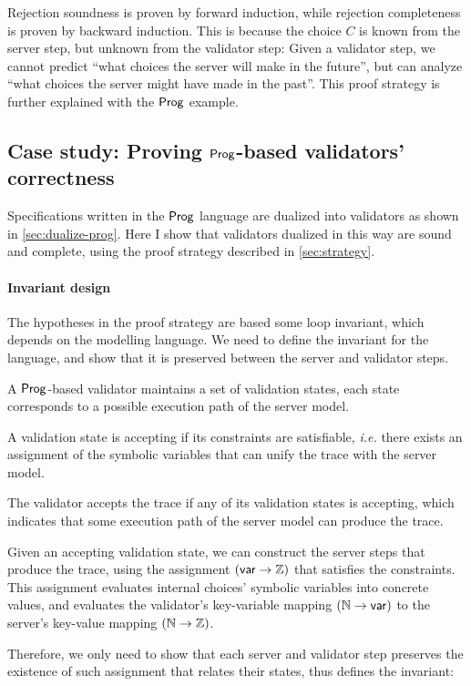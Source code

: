 Rejection soundness is proven by forward induction, while rejection completeness
is proven by backward induction.  This is because the choice $C$ is known from
the server step, but unknown from the validator step: Given a validator step, we
cannot predict ``what choices the server will make in the future'', but can
analyze ``what choices the server might have made in the past''.  This proof
strategy is further explained with the $\mathsf{Prog}$ example.

\subsection{Case study: Proving $\mathsf{Prog}$-based validators' correctness}
Specifications written in the $\mathsf{Prog}$ language are dualized into validators as
shown in \autoref{sec:dualize-prog}.  Here I show that validators dualized in
this way are sound and complete, using the proof strategy described
in \autoref{sec:strategy}.

\paragraph{Invariant design}
The hypotheses in the proof strategy are based some loop invariant, which
depends on the modelling language.  We need to define the invariant for the
language, and show that it is preserved between the server and validator steps.

A $\mathsf{Prog}$-based validator maintains a set of validation states, each state
corresponds to a possible execution path of the server model.

A validation state is accepting if its constraints are satisfiable, {\it i.e.}
there exists an assignment of the symbolic variables that can unify the trace
with the server model.

The validator accepts the trace if any of its validation states is accepting,
which indicates that some execution path of the server model can produce the
trace.

Given an accepting validation state, we can construct the server steps that
produce the trace, using the assignment $(\mathsf{var}\to\mathbb Z)$ that satisfies the
constraints.  This assignment evaluates internal choices' symbolic variables
into concrete values, and evaluates the validator's key-variable mapping
$(\mathbb N\to\mathsf{var})$ to the server's key-value mapping $(\mathbb N\to\mathbb Z)$.

Therefore, we only need to show that each server and validator step preserves
the existence of such assignment that relates their states, thus defines the
invariant:

